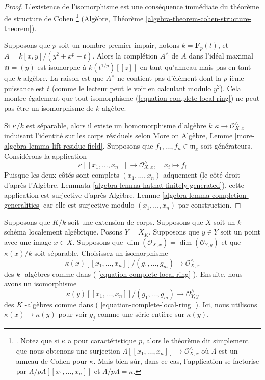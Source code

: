 \begin{proof}
L'existence de l'isomorphisme est une conséquence immédiate du
théorème de structure de Cohen \footnote {. Notez que si $\kappa$ a
pour caractéristique $p$, alors le théorème dit simplement que nous
obtenons une surjection $\Lambda[[x_1, \ldots, x_n]] \to
\mathcal{O}_{X, x}^\wedge$ où $\Lambda$ est un anneau de Cohen pour
$\kappa$. Mais bien sûr, dans ce cas, l'application se factorise par
$\Lambda/p\Lambda[[x_1, \ldots, x_n]]$ et $\Lambda/p\Lambda = \kappa$.
} (Algèbre, Théorème \ref{algebra-theorem-cohen-structure-theorem}).

\medskip\noindent
Supposons que $p$ soit un nombre premier impair, notons $k =
\mathbf{F}_p(t)$, et $A = k[x, y]/(y^2 + x^p - t)$. Alors la
complétion $A^\wedge$ de $A$ dans l'idéal maximal $\mathfrak m
= (y)$ est isomorphe à $k(t^{1/p})[[z]]$ en tant qu'anneau
mais pas en tant que $k$-algèbre. La raison est que $A^\wedge$
ne contient pas d'élément dont la $p$-ième puissance est $t$
(comme le lecteur peut le voir en calculant modulo $y^2$). Cela
montre également que tout isomorphisme
(\ref{equation-complete-local-ring}) ne peut pas être un isomorphisme de $k$-algèbre.

\medskip\noindent
Si $\kappa/k$ est séparable, alors il existe un
homomorphisme d'algèbre $k$ $\kappa \to \mathcal{O}_{X,
x}^\wedge$ induisant l'identité sur les corps résiduels
selon More on Algèbre, Lemme
\ref{more-algebra-lemma-lift-residue-field}. Supposons que $f_1,
\ldots, f_n \in \mathfrak m_x$ soit générateurs. Considérons la application
$$
\kappa[[x_1, \ldots, x_n]] \longrightarrow \mathcal{O}_{X, x}^\wedge,\quad
x_i \longmapsto f_i
$$
Puisque les deux côtés sont complets $(x_1,
\ldots, x_n)$-adquement (le côté droit d'après
l'Algèbre, Lemmata
\ref{algebra-lemma-hathat-finitely-generated}), cette
application est surjective d'après Algèbre, Lemme
\ref{algebra-lemma-completion-generalities} car elle est
surjective modulo $(x_1, \ldots, x_n)$ par construction.
\end{proof}

\begin{lemma}
\label{lemma-base-change-complete-local-ring}
Supposons que $K/k$ soit une extension de corps. Supposons que
$X$ soit un $k$-schéma localement algébrique. Posons $Y = X_K$.
Supposons que $y \in Y$ soit un point avec une image $x \in X$.
Supposons que $\dim(\mathcal{O}_{X, x}) = \dim(\mathcal{O}_{Y,
y})$ et que $\kappa(x)/k$ soit séparable. Choisissez un isomorphisme
$$
\kappa(x)[[x_1, \ldots, x_n]]/(g_1, \ldots, g_m) \longrightarrow
\mathcal{O}_{X, x}^\wedge
$$
des $k$ -algèbres comme dans (
\ref{equation-complete-local-ring} ). Ensuite, nous avons un isomorphisme
$$
\kappa(y)[[x_1, \ldots, x_n]]/(g_1, \ldots, g_m) \longrightarrow
\mathcal{O}_{Y, y}^\wedge
$$
des $K$ -algèbres comme dans (
\ref{equation-complete-local-ring} ). Ici, nous utilisons $\kappa(x)
\to \kappa(y)$ pour voir $g_j$ comme une série entière sur $\kappa(y)$.
\end{lemma}

